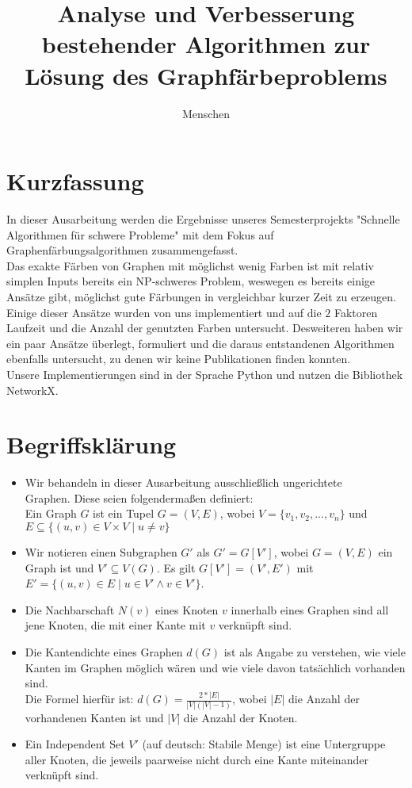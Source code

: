 \documentclass[11pt]{article}
\title{Analyse und Verbesserung bestehender Algorithmen zur Lösung des Graphfärbeproblems}
\author{Menschen} %
\begin{document}
\maketitle

\tableofcontents
\newpage

\section{Kurzfassung} %

In dieser Ausarbeitung werden die Ergebnisse unseres Semesterprojekts "Schnelle Algorithmen für schwere Probleme" mit dem Fokus auf
Graphenfärbungsalgorithmen zusammengefasst. \\ 
Das exakte Färben von Graphen mit möglichst wenig Farben ist mit relativ simplen Inputs bereits ein NP-schweres Problem, weswegen es bereits einige Ansätze gibt,
möglichst gute Färbungen in vergleichbar kurzer Zeit zu erzeugen. Einige dieser Ansätze wurden von uns implementiert und auf die $2$ Faktoren 
Laufzeit und die Anzahl der genutzten Farben untersucht.
Desweiteren haben wir ein paar Ansätze überlegt, formuliert und die daraus entstandenen Algorithmen ebenfalls untersucht, zu denen wir keine Publikationen finden konnten. \\
Unsere Implementierungen sind in der Sprache Python und nutzen die Bibliothek NetworkX.

\section{Begriffsklärung} %
\begin{itemize}[noitemsep, left=0pt]
\item Wir behandeln in dieser Ausarbeitung ausschließlich ungerichtete \\Graphen.
Diese seien folgendermaßen definiert:\\
Ein Graph $G$ ist ein Tupel $G=(V,E)$, wobei $V=\{v_1,v_2,...,v_n\}$ und $E\subseteq \{(u,v)\in V\times V \mid u\neq v\}$
\item Wir notieren einen Subgraphen $G'$ als 
$G'=G[V']$,
wobei $G=(V,E)$ ein Graph ist und $V'\subseteq V(G)$.
Es gilt $G[V']=(V',E')$ mit $E'=\{(u,v)\in E\mid u\in V'\land v\in V'\}$.
\item Die Nachbarschaft $N(v)$ eines Knoten $v$ innerhalb eines Graphen sind all jene Knoten,
die mit einer Kante mit $v$ verknüpft sind.
\item Die Kantendichte eines Graphen $d(G)$ ist als Angabe zu verstehen, wie viele Kanten im Graphen möglich wären und wie viele davon tatsächlich vorhanden sind. \\
Die Formel hierfür ist: $d(G) = \frac{2*|E|}{|V|(|V|-1)}$, wobei $|E|$ die Anzahl der vorhandenen Kanten ist und $|V|$ die Anzahl der Knoten. \\
\item Ein Independent Set $V'$ (auf deutsch: Stabile Menge) ist eine Untergruppe aller Knoten, die jeweils paarweise nicht durch eine
Kante miteinander verknüpft sind. 
\end{itemize}
\end{document}
